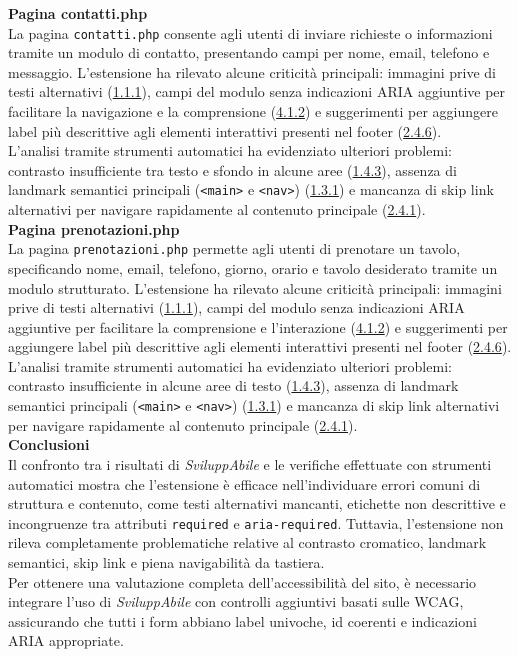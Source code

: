\noindent \textbf{Pagina contatti.php}\\
La pagina \texttt{contatti.php} consente agli utenti di inviare richieste o informazioni tramite un modulo di contatto, presentando campi per nome, email, telefono e messaggio. L’estensione ha rilevato alcune criticità principali: immagini prive di testi alternativi ({\hyperref[wcag:1.1.1]{1.1.1}}), campi del modulo senza indicazioni ARIA aggiuntive per facilitare la navigazione e la comprensione ({\hyperref[wcag:4.1.2]{4.1.2}}) e suggerimenti per aggiungere label più descrittive agli elementi interattivi presenti nel footer ({\hyperref[wcag:2.4.6]{2.4.6}}).\\
L’analisi tramite strumenti automatici ha evidenziato ulteriori problemi: contrasto insufficiente tra testo e sfondo in alcune aree ({\hyperref[wcag:1.4.3]{1.4.3}}), assenza di landmark semantici principali (\texttt{<main>} e \texttt{<nav>}) ({\hyperref[wcag:1.3.1]{1.3.1}}) e mancanza di skip link alternativi per navigare rapidamente al contenuto principale ({\hyperref[wcag:2.4.1]{2.4.1}}).\\

\noindent \textbf{Pagina prenotazioni.php}\\
La pagina \texttt{prenotazioni.php} permette agli utenti di prenotare un tavolo, specificando nome, email, telefono, giorno, orario e tavolo desiderato tramite un modulo strutturato. L’estensione ha rilevato alcune criticità principali: immagini prive di testi alternativi ({\hyperref[wcag:1.1.1]{1.1.1}}), campi del modulo senza indicazioni ARIA aggiuntive per facilitare la comprensione e l’interazione ({\hyperref[wcag:4.1.2]{4.1.2}}) e suggerimenti per aggiungere label più descrittive agli elementi interattivi presenti nel footer ({\hyperref[wcag:2.4.6]{2.4.6}}).\\
L’analisi tramite strumenti automatici ha evidenziato ulteriori problemi: contrasto insufficiente in alcune aree di testo ({\hyperref[wcag:1.4.3]{1.4.3}}), assenza di landmark semantici principali (\texttt{<main>} e \texttt{<nav>}) ({\hyperref[wcag:1.3.1]{1.3.1}}) e mancanza di skip link alternativi per navigare rapidamente al contenuto principale ({\hyperref[wcag:2.4.1]{2.4.1}}).\\

\noindent \textbf{Conclusioni}\\
Il confronto tra i risultati di \textit{SviluppAbile} e le verifiche effettuate con strumenti automatici mostra che l’estensione è efficace nell’individuare errori comuni di struttura e contenuto, come testi alternativi mancanti, etichette non descrittive e incongruenze tra attributi \texttt{required} e \texttt{aria-required}. Tuttavia, l’estensione non rileva completamente problematiche relative al contrasto cromatico, landmark semantici, skip link e piena navigabilità da tastiera.\\
Per ottenere una valutazione completa dell’accessibilità del sito, è necessario integrare l’uso di \textit{SviluppAbile} con controlli aggiuntivi basati sulle WCAG, assicurando che tutti i form abbiano label univoche, id coerenti e indicazioni ARIA appropriate.


